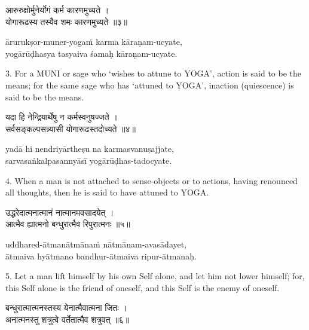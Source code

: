 \begin{gitaverse}
आरुरुक्षोर्मुनेर्योगं कर्म कारणमुच्यते । \\
योगारूढस्य तस्यैव शमः कारणमुच्यते ॥३॥
\end{gitaverse}

\begin{transliteration}
ārurukṣor-muner-yogaṁ karma kāraṇam-ucyate, \\
yogārūḍhasya tasyaiva śamaḥ kāraṇam-ucyate.
\end{transliteration}

3. For a MUNI or sage who `wishes to attune to YOGA', action is said to be the
means; for the same sage who has `attuned to YOGA', inaction (quiescence) is
said to be the means.

\begin{gitaverse}
यदा हि नेन्द्रियार्थेषु न कर्मस्वनुषज्जते । \\
सर्वसङ्कल्पसन्न्यासी योगारूढस्तदोच्यते ॥४॥
\end{gitaverse}

\begin{transliteration}
yadā hi nendriyārtheṣu na karmasvanuṣajjate, \\
sarvasaṅkalpasannyāsī yogārūḍhas-tadocyate.
\end{transliteration}

4. When a man is not attached to sense-objects or to actions, having renounced
all thoughts, then he is said to have attuned to YOGA.\@

\begin{gitaverse}
उद्धरेदात्मनात्मानं नात्मानमवसादयेत् । \\
आत्मैव ह्यात्मनो बन्धुरात्मैव रिपुरात्मनः ॥५॥
\end{gitaverse}

\begin{transliteration}
uddhared-ātmanātmānaṁ nātmānam-avasādayet, \\
ātmaiva hyātmano bandhur-ātmaiva ripur-ātmanaḥ.
\end{transliteration}

5. Let a man lift himself by his own Self alone, and let him not lower himself;
for, this Self alone is the friend of oneself, and this Self is the enemy of
oneself.

\begin{gitaverse}
बन्धुरात्मात्मनस्तस्य येनात्मैवात्मना जितः । \\
अनात्मनस्तु शत्रुत्वे वर्तेतात्मैव शत्रुवत् ॥६॥
\end{gitaverse}

